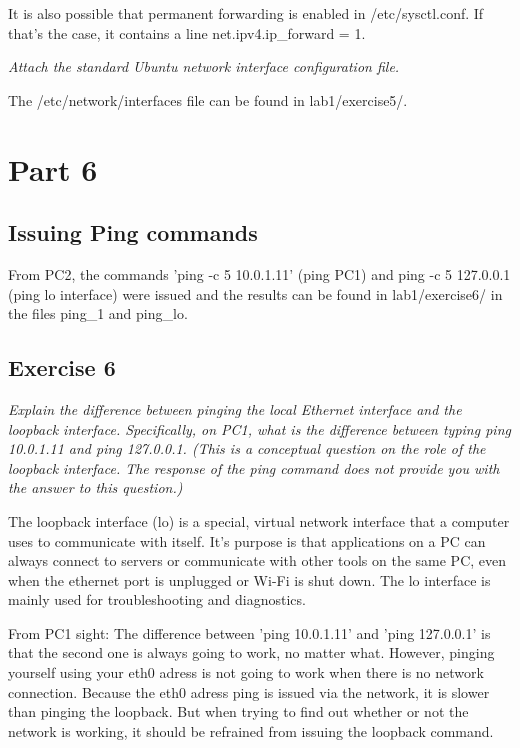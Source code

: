 \documentclass[a4paper, 11pt]{article}
\begin{document}
It is also possible that permanent forwarding is enabled in /etc/sysctl.conf. If that's the case, it contains a line 
net.ipv4.ip_forward = 1.

\emph{Attach the standard Ubuntu network interface configuration file.}

The /etc/network/interfaces file can be found in lab1/exercise5/.

\section{Part 6}

\subsection{Issuing Ping commands}

From PC2, the commands 'ping -c 5 10.0.1.11' (ping PC1) and ping -c 5 127.0.0.1 (ping lo interface) were issued and
the results can be found in lab1/exercise6/ in the files ping_1 and ping_lo.

\subsection{Exercise 6}

\emph{Explain the difference between pinging the local Ethernet interface and the loopback interface. Specifically, on PC1, what is the difference between typing ping 10.0.1.11 and ping 127.0.0.1.
(This is a conceptual question on the role of the loopback interface. The response of the ping command does not provide you with the answer to this question.)}
 
The loopback interface (lo) is a special, virtual network interface that a computer uses to communicate with itself. It's purpose is that applications on a PC can always
connect to servers or communicate with other tools on the same PC, even when the ethernet port is unplugged or Wi-Fi is shut down. The lo interface is mainly used for 
troubleshooting and diagnostics.
 
From PC1 sight: The difference between 'ping 10.0.1.11' and 'ping 127.0.0.1' is that the second one is always going to work, no matter what. However, pinging yourself using your eth0 adress is not 
going to work when there is no network connection. Because the eth0 adress ping is issued via the network, it is slower than pinging the loopback. But when trying to find out whether or not the network is working, it should be refrained from issuing the loopback command.
\end{document}
